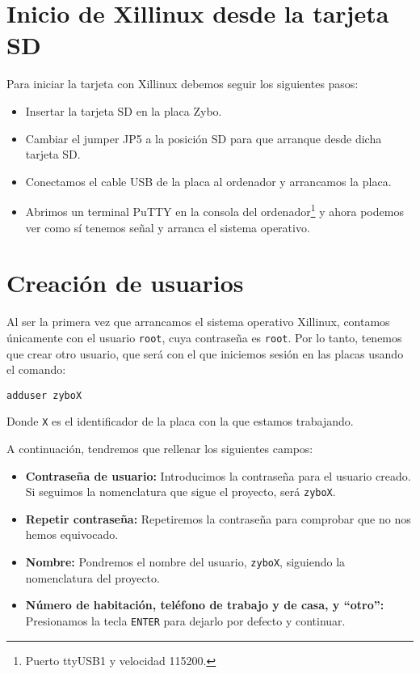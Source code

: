 \documentclass[12pt,letterpaper]{article}
\begin{document}
\section{Inicio de Xillinux desde la tarjeta SD}
Para iniciar la tarjeta con Xillinux debemos seguir los siguientes pasos:
\begin{itemize}
	\item Insertar la tarjeta SD en la placa Zybo.
	\item Cambiar el jumper JP5 a la posición SD para que arranque desde dicha tarjeta SD.
	\item Conectamos el cable USB de la placa al ordenador y arrancamos la placa.
	\item Abrimos un terminal PuTTY en la consola del ordenador\footnote{Puerto ttyUSB1 y velocidad 115200.} y ahora podemos ver como sí tenemos señal y arranca el sistema operativo.
\end{itemize}

\section{Creación de usuarios}
Al ser la primera vez que arrancamos el sistema operativo Xillinux, contamos únicamente con el usuario \texttt{root}, cuya contraseña es \texttt{root}. Por lo tanto, tenemos que crear otro usuario, que será con el que iniciemos sesión en las placas usando el comando:
\begin{center}
	\texttt{adduser zyboX}
\end{center}
Donde \texttt{X} es el identificador de la placa con la que estamos trabajando.

A continuación, tendremos que rellenar los siguientes campos:
\begin{itemize}
	\item \textbf{Contraseña de usuario:} Introducimos la contraseña para el usuario creado. Si seguimos la nomenclatura que sigue el proyecto, será \texttt{zyboX}.
	\item \textbf{Repetir contraseña:} Repetiremos la contraseña para comprobar que no nos hemos equivocado.
	\item \textbf{Nombre:} Pondremos el nombre del usuario, \texttt{zyboX}, siguiendo la nomenclatura del proyecto.
	\item \textbf{Número de habitación, teléfono de trabajo y de casa, y ``otro'':} Presionamos la tecla \texttt{ENTER} para dejarlo por defecto y continuar.
\end{itemize}
\end{document}
